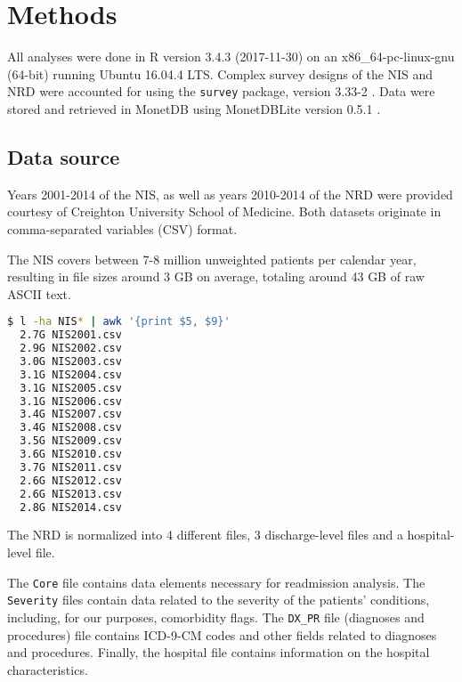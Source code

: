 \chapter{Methods}




All analyses were done in R version 3.4.3 (2017-11-30) on an x86\_64-pc-linux-gnu (64-bit) 
running Ubuntu 16.04.4 LTS. 
Complex survey designs of the NIS and NRD  were accounted for using the \texttt{survey} package, version 
3.33-2 \cite{Lumley2018}. Data were stored and retrieved in
MonetDB using MonetDBLite version 0.5.1 \cite{Muehleisen2018}.

\section{Data source}

Years 2001-2014 of the NIS, as well as years 2010-2014 of the NRD were provided courtesy of Creighton University
School of Medicine. Both datasets originate in comma-separated variables (CSV) format. 

The NIS covers between 7-8 million unweighted patients per calendar year, resulting in file sizes around 3 GB on average,
totaling around 43 GB of raw ASCII text.

\begin{lstlisting}[language=Bash]
  $ l -ha NIS* | awk '{print $5, $9}'
  2.7G NIS2001.csv                                                          
  2.9G NIS2002.csv                                                          
  3.0G NIS2003.csv                                                          
  3.1G NIS2004.csv                                                          
  3.1G NIS2005.csv                                                          
  3.1G NIS2006.csv                                                          
  3.4G NIS2007.csv                                                          
  3.4G NIS2008.csv                                                          
  3.5G NIS2009.csv
  3.6G NIS2010.csv
  3.7G NIS2011.csv
  2.6G NIS2012.csv
  2.6G NIS2013.csv
  2.8G NIS2014.csv
\end{lstlisting}

The NRD is normalized into 4 different files, 3 discharge-level files and a hospital-level file.

The \texttt{Core} file contains data elements necessary for readmission analysis. The \texttt{Severity} files
contain data related to the severity of the patients' conditions, including, for our purposes, comorbidity flags.
The \texttt{DX\_PR} file (diagnoses and procedures) file contains ICD-9-CM codes and other fields related to
diagnoses and procedures. Finally, the hospital file contains information on the hospital characteristics.

